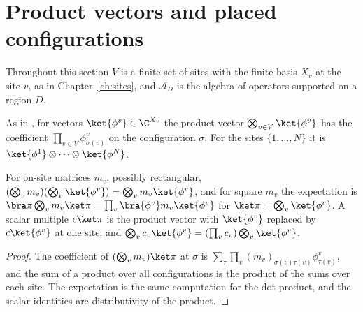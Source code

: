\section{Product vectors and placed configurations}
\label{sec:siteconfig_products}

Throughout this section $V$ is a finite set of sites with the finite basis
$X_v$ at the site $v$, as in Chapter~\ref{ch:sites}, and $\mathcal A_D$ is the
algebra of operators supported on a region $D$.

\begin{definition}
    \label{def:siteconfig_product_vector}
    \leanok
    As in \cite[Appendix~A, ``Product states'']{Cirac2021Matrix}, for vectors
    $\ket{\phi^v}\in\C^{X_v}$ the product vector
    $\bigotimes_{v\in V}\ket{\phi^v}$ has the coefficient
    $\prod_{v\in V}\phi^v_{\sigma(v)}$ on the configuration $\sigma$. For the
    sites $\{1,\dots,N\}$ it is $\ket{\phi^1}\otimes\cdots\otimes\ket{\phi^N}$.
\end{definition}

\begin{lemma}
    \label{lem:siteconfig_product_vector_action}
    \leanok
    For on-site matrices $m_v$, possibly rectangular,
    $(\bigotimes_v m_v)(\bigotimes_v\ket{\phi^v})=\bigotimes_v m_v\ket{\phi^v}$,
    and for square $m_v$ the expectation is
    $\bra\pi\bigotimes_v m_v\ket\pi=\prod_v\bra{\phi^v}m_v\ket{\phi^v}$ for
    $\ket\pi=\bigotimes_v\ket{\phi^v}$. A scalar multiple $c\ket\pi$ is the
    product vector with $\ket{\phi^v}$ replaced by $c\ket{\phi^v}$ at one site,
    and $\bigotimes_v c_v\ket{\phi^v}=(\prod_v c_v)\bigotimes_v\ket{\phi^v}$.
\end{lemma}
\begin{proof}
    \leanok
    The coefficient of $(\bigotimes_v m_v)\ket\pi$ at $\sigma$ is
    $\sum_\tau\prod_v (m_v)_{\sigma(v)\tau(v)}\phi^v_{\tau(v)}$, and the sum of
    a product over all configurations is the product of the sums over each
    site. The expectation is the same computation for the dot product, and the
    scalar identities are distributivity of the product.
\end{proof}

